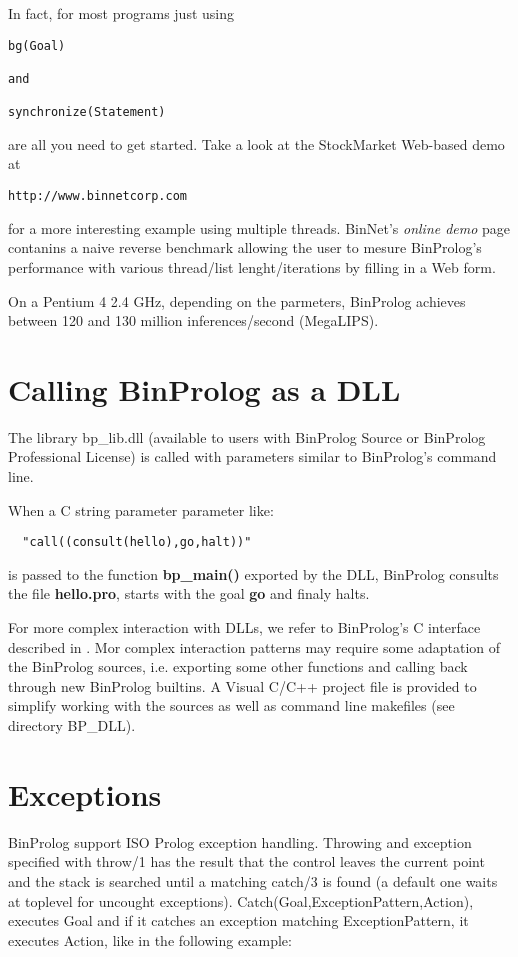 \documentclass{article}
\begin{document}
In fact, for most programs just using

{\small \begin{verbatim}
bg(Goal)

and

synchronize(Statement)
\end{verbatim}}

are all you need to get started.
Take a look at the StockMarket Web-based demo at
\begin{verbatim}
http://www.binnetcorp.com 
\end{verbatim}

for a more interesting example using multiple threads.
BinNet's {\em online demo} page contanins a naive reverse benchmark
allowing the user to mesure BinProlog's performance with various
thread/list lenght/iterations by filling in a Web form.

On a Pentium 4 2.4 GHz, depending on the parmeters, BinProlog
achieves between 120 and 130 million inferences/second (MegaLIPS).

\section{Calling BinProlog as a DLL}

The library bp\_lib.dll (available to users with BinProlog Source
or BinProlog Professional License) is called with parameters 
similar to BinProlog's command line. 

When a C string parameter parameter like:

\begin{verbatim}
  "call((consult(hello),go,halt))"
\end{verbatim}

\noindent is passed to the function {\bf bp\_main()} exported by the DLL,
BinProlog consults the file {\bf hello.pro}, starts with the goal
{\bf go} and finaly halts.

For more complex interaction with DLLs, we refer to BinProlog's C interface
described in \cite{bp7interface}.
Mor complex interaction patterns may require some adaptation of
the BinProlog sources, i.e. exporting some other functions and
calling back through new BinProlog builtins.
A Visual C/C++ project file is provided to simplify working with
the sources as well as command line makefiles (see directory BP\_DLL).

\section{Exceptions}
BinProlog support ISO Prolog exception handling.
Throwing and exception specified with throw/1 has
the result that the control leaves the current point
and the stack is searched until a matching catch/3
is found (a default one waits at toplevel for 
uncought exceptions). Catch(Goal,ExceptionPattern,Action),
executes Goal and if it catches an exception matching
ExceptionPattern, it executes Action, like in the
following example:
\end{document}
